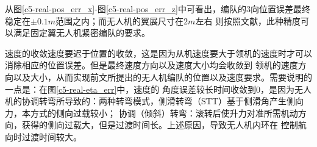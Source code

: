 从图\ref{c5-real-pos_err_x}-图\ref{c5-real-pos_err_z}中可看出，编队的3向位置误差最终稳定在$\pm0.1m$范围之内；而无人机的翼展尺寸在$2m$左右
则按照文献\cite{Zhang2017Aerodynamics}，此种精度可以满足固定翼无人机紧密编队的要求。

速度的收敛速度要迟于位置的收敛，这是因为从机速度要大于领机的速度时才可以消除相应的位置误差。但是最终速度方向以及速度大小均会收敛到
领机的速度方向以及大小，从而实现前文所提出的无人机编队的位置以及速度要求。需要说明的一点是：在图\ref{c5-real-eta_err}中，速度的
角度误差较长时间收敛到0，是因为无人机的协调转弯所导致的：两种转弯模式，侧滑转弯（STT）基于侧滑角产生侧向力，本方式的侧向过载较小；
协调（倾斜）转弯：滚转后使升力对准所需机动方向，获得的侧向过载大，但是过渡时间长。\cite{YuJianQiao2010}上述原因，导致无人机内环在
控制航向时过渡时间较大。
